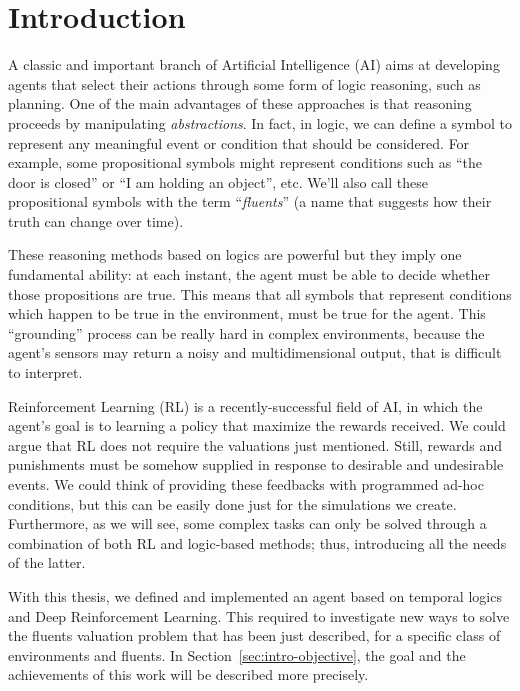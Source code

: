 \chapter{Introduction}

A classic and important branch of Artificial Intelligence (AI) aims at
developing agents that select their actions through some form of logic
reasoning, such as planning. One of the main advantages of these approaches is
that reasoning proceeds by manipulating \emph{abstractions}. In fact, in
logic, we can define a symbol to represent any meaningful event or condition
that should be considered. For example, some propositional symbols might
represent conditions such as ``the door is closed'' or ``I am holding an
object'', etc. We'll also call these propositional symbols with the term
``\emph{fluents}'' (a name that suggests how their truth can change over
time).

These reasoning methods based on logics are powerful but they imply one
fundamental ability: at each instant, the agent must be able to decide whether
those propositions are true. This means that all symbols that represent
conditions which happen to be true in the environment, must be true for the
agent. This ``grounding'' process can be really hard in complex environments,
because the agent's sensors may return a noisy and multidimensional output,
that is difficult to interpret.

Reinforcement Learning (RL) is a recently-successful field of AI, in which the
agent's goal is to learning a policy that maximize the rewards received.  We
could argue that RL does not require the valuations just mentioned. Still,
rewards and punishments must be somehow supplied in response to desirable and
undesirable events. We could think of providing these feedbacks with
programmed ad-hoc conditions, but this can be easily done just for the
simulations we create. Furthermore, as we will see, some complex tasks can
only be solved through a combination of both RL and logic-based methods; thus,
introducing all the needs of the latter.

With this thesis, we defined and implemented an agent based on temporal logics
and Deep Reinforcement Learning. This required to investigate new ways to
solve the fluents valuation problem that has been just described, for a
specific class of environments and fluents. In
Section~\ref{sec:intro-objective}, the goal and the achievements of this work
will be described more precisely.


